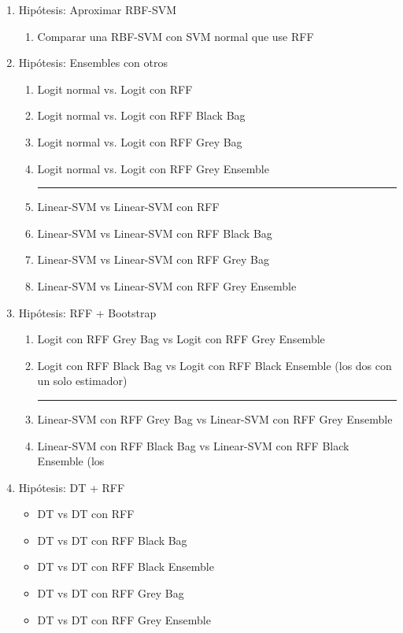 \begin{note}
  \begin{enumerate}
    \item Hipótesis: Aproximar RBF-SVM
    \begin{enumerate}
      \item Comparar una RBF-SVM con SVM normal que use RFF
    \end{enumerate}
    \item Hipótesis: Ensembles con otros
    \begin{enumerate}
      \item Logit normal vs. Logit con RFF
      \item Logit normal vs. Logit con RFF Black Bag
      \item Logit normal vs. Logit con RFF Grey Bag
      \item Logit normal vs. Logit con RFF Grey Ensemble
      \hrule
      \item Linear-SVM vs Linear-SVM con RFF
      \item Linear-SVM vs Linear-SVM con RFF Black Bag
      \item Linear-SVM vs Linear-SVM con RFF Grey Bag
      \item Linear-SVM vs Linear-SVM con RFF Grey Ensemble
    \end{enumerate}
    \item Hipótesis: RFF + Bootstrap
    \begin{enumerate}
      \item Logit con RFF Grey Bag vs Logit con RFF Grey Ensemble
      \item Logit con RFF Black Bag vs Logit con RFF Black Ensemble (los
      dos con un solo estimador)
      \hrule
      \item Linear-SVM con RFF Grey Bag vs Linear-SVM con RFF Grey Ensemble
      \item Linear-SVM con RFF Black Bag vs Linear-SVM con RFF Black Ensemble (los
    \end{enumerate}
    \item Hipótesis: DT + RFF
    \begin{itemize}
      \item DT vs DT con RFF
      \item DT vs DT con RFF Black Bag
      \item DT vs DT con RFF Black Ensemble
      \item DT vs DT con RFF Grey Bag
      \item DT vs DT con RFF Grey Ensemble
    \end{itemize}
  \end{enumerate}
\end{note}

